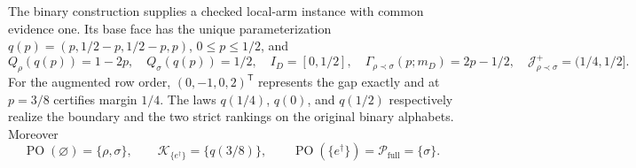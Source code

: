 The binary construction supplies a checked local-arm instance with common evidence one.  Its base face has the unique parameterization \(q(p)=(p,1/2-p,1/2-p,p)\), \(0\le p\le1/2\), and
\[
Q_\rho(q(p))=1-2p,\quad Q_\sigma(q(p))=1/2,\quad
I_D=[0,1/2],\quad \Gamma_{\rho\prec\sigma}(p;m_D)=2p-1/2,\quad
\mathcal J_{\rho\prec\sigma}^+=(1/4,1/2].
\]
For the augmented row order, \((0,-1,0,2)^{\mathsf T}\) represents the gap exactly and at \(p=3/8\) certifies margin \(1/4\).  The laws \(q(1/4)\), \(q(0)\), and \(q(1/2)\) respectively realize the boundary and the two strict rankings on the original binary alphabets.  Moreover
\[
\operatorname{PO}(\varnothing)=\{\rho,\sigma\},\qquad
\mathcal K_{\{e^\dagger\}}=\{q(3/8)\},\qquad
\operatorname{PO}(\{e^\dagger\})=\mathcal P_{\mathrm{full}}=\{\sigma\}.
\]